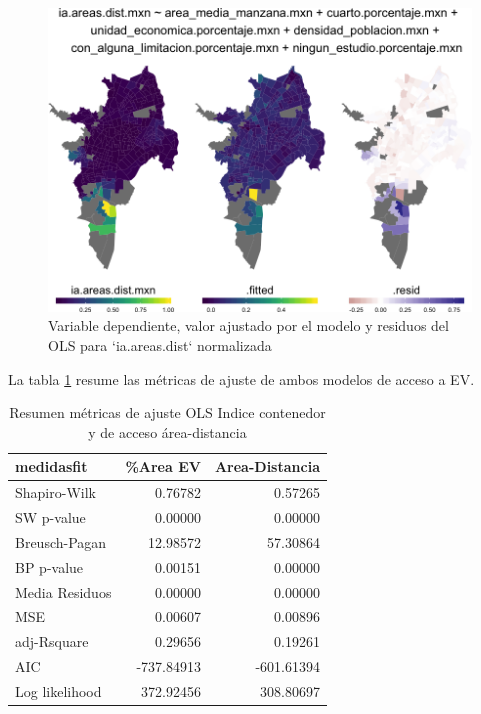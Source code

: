 \documentclass[12pt,]{book}
\begin{document}
\begin{figure}
\includegraphics[width=1\linewidth]{tesis-unigis_files/figure-latex/mapas-lm-areasdist-1} \caption{Variable dependiente, valor ajustado por el modelo y residuos del OLS para `ia.areas.dist` normalizada}\label{fig:mapas-lm-areasdist}
\end{figure}

La tabla \ref{tab:ajuste-lmEV-pob-predios} resume las métricas de ajuste
de ambos modelos de acceso a EV.

\begin{table}

\caption{\label{tab:ajuste-lmEV-pob-predios}Resumen métricas de ajuste OLS Indice contenedor y de acceso área-distancia }
\centering
\begin{tabular}[t]{l|r|r}
\hline
medidasfit & \%Area EV & Area-Distancia\\
\hline
Shapiro-Wilk & 0.76782 & 0.57265\\
\hline
SW p-value & 0.00000 & 0.00000\\
\hline
Breusch-Pagan & 12.98572 & 57.30864\\
\hline
BP p-value & 0.00151 & 0.00000\\
\hline
Media Residuos & 0.00000 & 0.00000\\
\hline
MSE & 0.00607 & 0.00896\\
\hline
adj-Rsquare & 0.29656 & 0.19261\\
\hline
AIC & -737.84913 & -601.61394\\
\hline
Log likelihood & 372.92456 & 308.80697\\
\hline
\end{tabular}
\end{table}
\end{document}
